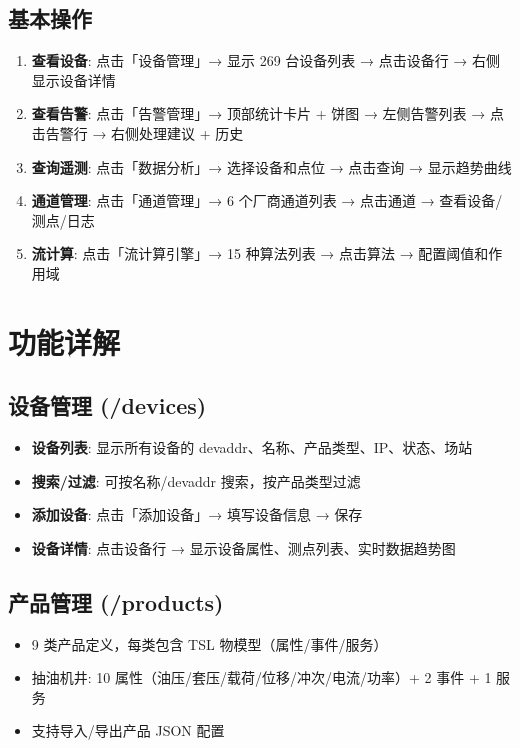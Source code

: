 \documentclass[12pt,a4paper]{ctexart}
\begin{document}
\subsection{基本操作}
\begin{enumerate}[leftmargin=*]
  \item \textbf{查看设备}: 点击「设备管理」→ 显示 269 台设备列表 → 点击设备行 → 右侧显示设备详情
  \item \textbf{查看告警}: 点击「告警管理」→ 顶部统计卡片 + 饼图 → 左侧告警列表 → 点击告警行 → 右侧处理建议 + 历史
  \item \textbf{查询遥测}: 点击「数据分析」→ 选择设备和点位 → 点击查询 → 显示趋势曲线
  \item \textbf{通道管理}: 点击「通道管理」→ 6 个厂商通道列表 → 点击通道 → 查看设备/测点/日志
  \item \textbf{流计算}: 点击「流计算引擎」→ 15 种算法列表 → 点击算法 → 配置阈值和作用域
\end{enumerate}

\section{功能详解}

\subsection{设备管理 (/devices)}
\begin{itemize}[leftmargin=*]
  \item \textbf{设备列表}: 显示所有设备的 devaddr、名称、产品类型、IP、状态、场站
  \item \textbf{搜索/过滤}: 可按名称/devaddr 搜索，按产品类型过滤
  \item \textbf{添加设备}: 点击「添加设备」→ 填写设备信息 → 保存
  \item \textbf{设备详情}: 点击设备行 → 显示设备属性、测点列表、实时数据趋势图
\end{itemize}

\subsection{产品管理 (/products)}
\begin{itemize}[leftmargin=*]
  \item 9 类产品定义，每类包含 TSL 物模型（属性/事件/服务）
  \item 抽油机井: 10 属性（油压/套压/载荷/位移/冲次/电流/功率）+ 2 事件 + 1 服务
  \item 支持导入/导出产品 JSON 配置
\end{itemize}
\end{document}
